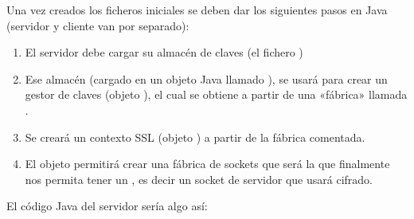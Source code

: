 \documentclass[letterpaper,10pt,spanish]{sphinxmanual}
\begin{document}
Una vez creados los ficheros iniciales se deben dar los siguientes pasos en Java (servidor y cliente van por separado):
\begin{enumerate}
\def\theenumi{\arabic{enumi}}
\def\labelenumi{\theenumi .}
\makeatletter\def\p@enumii{\p@enumi \theenumi .}\makeatother
\item {} 
El servidor debe cargar su almacén de claves (el fichero )

\item {} 
Ese almacén (cargado en un objeto Java llamado ), se usará para crear un gestor de claves (objeto ), el cual se obtiene a partir de una «fábrica» llamada .

\item {} 
Se creará un contexto SSL (objeto ) a partir de la fábrica comentada.

\item {} 
El objeto  permitirá crear una fábrica de sockets que será la que finalmente nos permita tener un , es decir un socket de servidor que usará cifrado.

\end{enumerate}

El código Java del servidor sería algo así:
\end{document}

